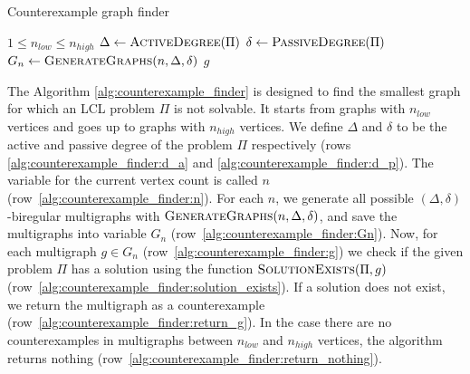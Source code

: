 \begin{algorithm}[H]
    \caption{Counterexample graph finder}
    \label{alg:counterexample_finder}
    \begin{algorithmic}[1] %
        \Require $1 \leq n_{low} \leq n_{high}$
          \label{alg:counterexample_finder:n_loop}
            \State $\Delta \gets \textsc{ActiveDegree}(\Pi)$ \label{alg:counterexample_finder:d_a}
            \State $\delta \gets \textsc{PassiveDegree}(\Pi)$ \label{alg:counterexample_finder:d_p}
              \label{alg:counterexample_finder:n}
                \State $G_n \gets \textsc{GenerateGraphs}(n, \Delta, \delta)$ \label{alg:counterexample_finder:Gn}
                 \label{alg:counterexample_finder:g}
                     \label{alg:counterexample_finder:solution_exists}
                        \State \Return $g$ \label{alg:counterexample_finder:return_g}
                    \EndIf
                \EndFor
            \EndFor
            \State \Return {} \label{alg:counterexample_finder:return_nothing}
        \EndFunction
    \end{algorithmic}
\end{algorithm}

The Algorithm \ref{alg:counterexample_finder} is designed to find the smallest graph for which an LCL problem $\Pi$ is not solvable.
It starts from graphs with $n_{low}$ vertices and goes up to graphs with $n_{high}$ vertices.
We define $\Delta$ and $\delta$ to be the active and passive degree of the problem $\Pi$ respectively (rows \ref{alg:counterexample_finder:d_a} and \ref{alg:counterexample_finder:d_p}).
The variable for the current vertex count is called $n$ (row~\ref{alg:counterexample_finder:n}).
For each $n$, we generate all possible $(\Delta, \delta)$-biregular multigraphs with $\textsc{GenerateGraphs}(n, \Delta, \delta)$, and save the multigraphs into variable $G_n$ (row~\ref{alg:counterexample_finder:Gn}).
Now, for each multigraph $g \in G_n$ (row~\ref{alg:counterexample_finder:g}) we check if the given problem $\Pi$ has a solution using the function $\textsc{SolutionExists}(\Pi, g)$ (row~\ref{alg:counterexample_finder:solution_exists}).
If a solution does not exist, we return the multigraph as a counterexample (row~\ref{alg:counterexample_finder:return_g}).
In the case there are no counterexamples in multigraphs between $n_{low}$ and $n_{high}$ vertices, the algorithm returns nothing (row~\ref{alg:counterexample_finder:return_nothing}).

